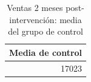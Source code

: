 
\begin{longtable}[t]{r}
\caption{Ventas 2 meses post-intervención: media del grupo de control}\\
\toprule
Media de control\\
\midrule
17023\\
\bottomrule
\end{longtable}
